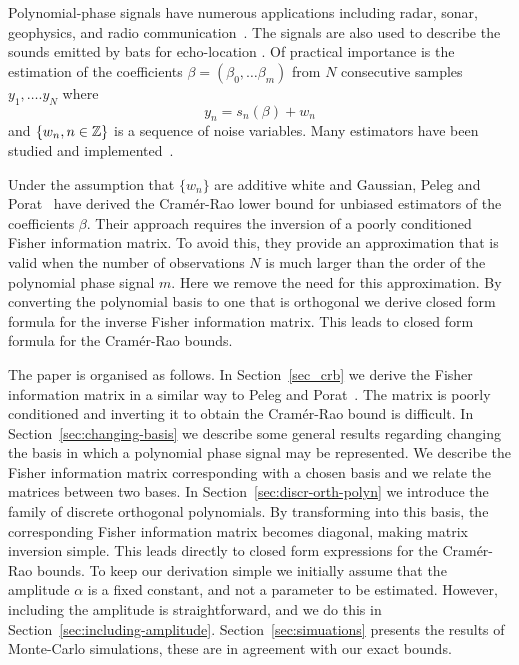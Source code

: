 \documentclass[journal,10pt]{IEEEtran}
\begin{document}
Polynomial-phase signals have numerous applications including radar, sonar, geophysics, and radio communication~\cite{Angeby_estimating_2000}.  The signals are also used to describe the sounds emitted by bats for echo-location \cite{Peleg_DPT_1995}.  Of practical importance is the estimation of the coefficients $\beta = (\beta_0, \dots \beta_m)$ from $N$ consecutive samples $y_1, \dots. y_N$ where 
\[
y_n = s_n(\beta) + w_n
\]
and $\{w_n, n \in {\mathbb Z}\}$ is a sequence of noise variables.  Many estimators have been studied and implemented~\cite{Peleg_DPT_1995, Angeby_estimating_2000, Djuric_phase_unwrap_chirp_1990, Oshea_iterative_1996, Barbarossa_analysis_of_PPS_1997, Slocumb_polynomial_1994, Morelande_bayes_unwrapping_2008, Kitchen_polyphase_unwrapping_1994}.

Under the assumption that $\{w_n\}$ are additive white and Gaussian, Peleg and Porat~\cite{Peleg1991_CRB_PPS_1991} have derived the Cram\'{e}r-Rao lower bound for unbiased estimators of the coefficients $\beta$.  Their approach requires the inversion of a poorly conditioned Fisher information matrix.  To avoid this, they provide an approximation that is valid when the number of observations $N$ is much larger than the order of the polynomial phase signal $m$.  Here we remove the need for this approximation.  By converting the polynomial basis to one that is orthogonal we derive closed form formula for the inverse Fisher information matrix.  This leads to closed form formula for the Cram\'{e}r-Rao bounds.  %

The paper is organised as follows.  In Section~\ref{sec_crb} we derive the Fisher information matrix in a similar way to Peleg and Porat~\cite{Peleg1991_CRB_PPS_1991}.  The matrix is poorly conditioned and inverting it to obtain the Cram\'{e}r-Rao bound is difficult.  In Section~\ref{sec:changing-basis} we describe some general results regarding changing the basis in which a polynomial phase signal may be represented.  We describe the Fisher information matrix corresponding with a chosen basis and we relate the matrices between two bases.  In Section~\ref{sec:discr-orth-polyn} we introduce the family of discrete orthogonal polynomials.  By transforming into this basis, the corresponding Fisher information matrix becomes diagonal, making matrix inversion simple.  This leads directly to closed form expressions for the Cram\'{e}r-Rao bounds.  To keep our derivation simple we initially assume that the amplitude $\alpha$ is a fixed constant, and not a parameter to be estimated.  However, including the amplitude is straightforward, and we do this in Section~\ref{sec:including-amplitude}.  Section~\ref{sec:simuations} presents the results of Monte-Carlo simulations, these are in agreement with our exact bounds.
\end{document}
